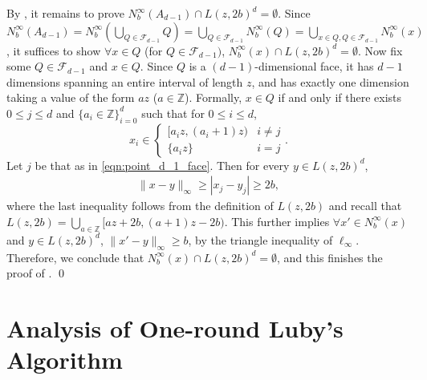 \documentclass[11pt,letterpaper]{article}
\theoremstyle{plain}
\theoremstyle{definition}
\theoremstyle{remark}
\def\ZZ{{\mathbb{Z}}}
\begin{document}
By , it remains to prove $N_b^\infty(A_{d - 1}) \cap L(z, 2b)^d = \emptyset$.
Since $N_b^\infty(A_{d - 1}) = N_b^\infty(\bigcup_{Q \in \mathcal{F}_{d - 1}} Q)
= \bigcup_{Q \in \mathcal{F}_{d - 1}} N_b^\infty(Q) = \bigcup_{x \in Q, Q \in \mathcal{F}_{d - 1}}N_b^\infty(x)$,
it suffices to show $\forall x \in Q$ (for $ Q \in \mathcal{F}_{d - 1})$,
$N_b^\infty(x) \cap L(z, 2b)^d = \emptyset$.
Now fix some $Q \in \mathcal{F}_{d - 1}$ and $x \in Q$.
Since $Q$ is a $(d - 1)$-dimensional face, it has $d - 1$ dimensions spanning an entire interval of length $z$, and has exactly one dimension taking a value of the form $az$ ($a \in \ZZ$).
Formally, $x \in Q$ if and only if there exists
$0 \leq j \leq d$ and $\{a_i \in \ZZ\}_{i = 0}^d$ such that for $0 \leq i \leq d$,
\begin{equation}
    \label{eqn:point_d_1_face}
    x_i \in \begin{cases}
        [a_i z, (a_i + 1) z) & i \neq j \\
        \{ a_i z \} & i = j
    \end{cases}.
\end{equation}
Let $j$ be that as in \eqref{eqn:point_d_1_face}. Then for every $y \in L(z, 2b)^d$, 
\begin{align*}
    \|x - y\|_\infty
    \geq |x_j - y_j|
    \geq 2b,
\end{align*}
where the last inequality follows from the definition of $L(z, 2b)$ and recall that $L(z, 2b) = \bigcup_{a \in \ZZ} [az + 2b, (a + 1)z - 2b)$.
This further implies $\forall x' \in N_b^\infty(x)$ and $y \in L(z, 2b)^d$,
$\|x' - y\|_\infty \geq b$,
by the triangle inequality of $\ell_\infty$.
Therefore, we conclude that $N_b^\infty(x) \cap L(z, 2b)^d = \emptyset$,
and this finishes the proof of .
\qed
























     \section{Analysis of One-round Luby's Algorithm}
\label{sec:one_round_luby}
\end{document}
